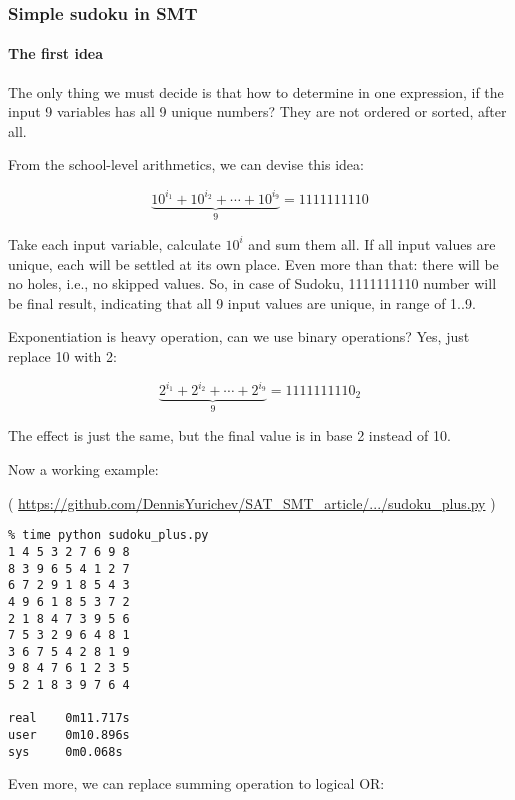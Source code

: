 \subsubsection{Simple sudoku in SMT}
\label{sudoku_SMT}

\paragraph{The first idea}

The only thing we must decide is that how to determine in one expression, if the input 9 variables has all 9 unique numbers?
They are not ordered or sorted, after all.

From the school-level arithmetics, we can devise this idea:

\begin{equation}
\underbrace{10^{i_1} + 10^{i_2} + \cdots + 10^{i_9}}_9 = 1111111110
\end{equation}

Take each input variable, calculate $10^i$ and sum them all.
If all input values are unique, each will be settled at its own place.
Even more than that: there will be no holes, i.e., no skipped values.
So, in case of Sudoku, 1111111110 number will be final result, indicating that all 9 input values are unique, in range of 1..9.

Exponentiation is heavy operation, can we use binary operations? Yes, just replace 10 with 2:

\begin{equation}
\underbrace{2^{i_1} + 2^{i_2} + \cdots + 2^{i_9}}_9 = 1111111110_2
\end{equation}

The effect is just the same, but the final value is in base 2 instead of 10.

Now a working example:


( \url{https://github.com/DennisYurichev/SAT_SMT_article/.../sudoku_plus.py} )

\begin{lstlisting}
% time python sudoku_plus.py
1 4 5 3 2 7 6 9 8
8 3 9 6 5 4 1 2 7
6 7 2 9 1 8 5 4 3
4 9 6 1 8 5 3 7 2
2 1 8 4 7 3 9 5 6
7 5 3 2 9 6 4 8 1
3 6 7 5 4 2 8 1 9
9 8 4 7 6 1 2 3 5
5 2 1 8 3 9 7 6 4

real    0m11.717s
user    0m10.896s
sys     0m0.068s
\end{lstlisting}

Even more, we can replace summing operation to logical OR:

